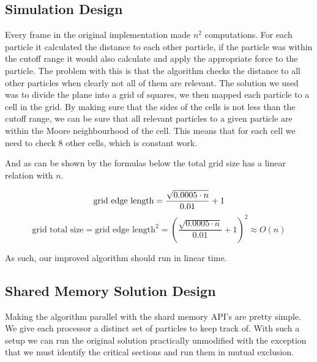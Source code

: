 
    \subsection{Simulation Design}

        Every frame in the original implementation made $n^2$ computations. For
        each particle it calculated the distance to each other particle, if the
        particle was within the cutoff range it would also calculate and apply
        the appropriate force to the particle. The problem with this is that the
        algorithm checks the distance to all other particles when clearly not
        all of them are relevant. The solution we used was to divide the plane
        into a grid of squares, we then mapped each particle to a cell in the
        grid. By making sure that the sides of the cells is not less than the
        cutoff range, we can be sure that all relevant particles to a given
        particle are within the Moore neighbourhood of the cell. This means that
        for each cell we need to check 8 other cells, which is constant work.

        And as can be shown by the formulas below the total grid size has a
        linear relation with $n$.

        \begin{equation*}
            \text{grid edge length} = \frac{\sqrt{0.0005 \cdot n}}{0.01} + 1 \\
        \end{equation*}
        \begin{equation*}
            \text{grid total size} = \text{grid edge length}^2 = \left(\frac{\sqrt{0.0005 \cdot n}}{0.01} + 1\right)^2 \approx O(n)
        \end{equation*}

        As such, our improved algorithm should run in linear time.

    \subsection{Shared Memory Solution Design}

    Making the algorithm parallel with the shard memory API's are pretty simple.
    We give each processor a distinct set of particles to keep track of. With
    such a setup we can run the original solution practically unmodified with
    the exception that we must identify the critical sections and run them in
    mutual exclusion.


